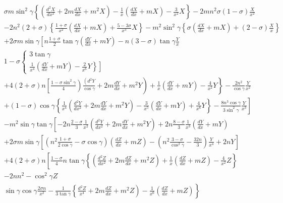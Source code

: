 \[\begin{aligned}
& \sigma m \sin ^2 \gamma\left\{\left(\frac{d^2 X}{d x^2}+2 m \frac{d X}{d x}+m^2 X\right)-\frac{1}{x}\left(\frac{d X}{d x}+m X\right)-\frac{3}{x^2} X\right\}-2 m n^2 \sigma(1-\sigma) \frac{X}{x^2} \\
& -2 n^2(2+\sigma)\left\{\frac{1+\sigma}{x^2}\left(\frac{d X}{d x}+m X\right)+\frac{5-3 \sigma}{x^3} X\right\}-m^2 \sin ^2 \gamma\left\{\sigma\left(\frac{d X}{d x}+m X\right)+(2-\sigma) \frac{X}{x}\right\} \\
& +2 \sigma m \sin \gamma\left[n \frac{1+\sigma}{2} \tan \gamma\left(\frac{d Y}{d x}+m Y\right)-n(3-\sigma) \tan \gamma \frac{Y}{x}\right. \\
& 1-\sigma\left\{\begin{array}{c}
3 \tan \gamma \\
\left.\left.\frac{1}{x^4}\left(\frac{d Y}{d x}+m Y\right)-\frac{2}{x^6} Y\right\}\right]
\end{array}\right. \\
& \left.\left.+4(2+\sigma) n\left[\frac{1-\sigma \sin ^2 \gamma}{4}\right) \frac{\left(d^2 Y\right.}{\cos \gamma}+2 m \frac{d Y}{d x}+m^2 Y\right)+\frac{1}{x}\left(\frac{d Y}{d x}+m Y\right)-\frac{4}{x^2} Y\right\}-\frac{2 n^2}{\cos \gamma} \frac{Y}{x^2} \\
& \left.+(1-\sigma) \cos \gamma\left\{\frac{1}{x^4}\left(\frac{d^2 Y}{d x^2}+2 m \frac{d Y}{d x}+m^2 Y\right)-\frac{3}{x^5}\left(\frac{d Y}{d x}+m Y\right)+\frac{4}{x^6} Y\right\}-\frac{8 n^3 \cos \gamma}{3 \sin ^2 \gamma} \frac{Y}{x^3}\right] \\
& -m^2 \sin \gamma \tan \gamma\left[-2 n \frac{2-\sigma}{3} \frac{1}{x^2}\left(\frac{d^2 Y}{d x^2}+2 m \frac{d Y}{d x}+m^2 Y\right)+2 n \frac{8-\sigma}{3} \frac{1}{x^3}\left(\frac{d Y}{d x}+m Y\right)\right. \\
& +2 \sigma m \sin \gamma\left[\left(n^2 \frac{1+\sigma}{2 \cos \gamma}-\sigma \cos \gamma\right)\left(\frac{d Z}{d x}+m Z\right)-\left(n^2 \frac{3-\sigma}{\cos ^2 \gamma}-\frac{32 n}{3}\right) \frac{Y}{x^4}+2 n Y\right] \\
& +4(2+\sigma) n\left[\frac{1-\sigma}{4} n \tan \gamma\left\{\left(\frac{d^2 Z}{d x^2}+2 m \frac{d Z}{d x}+m^2 Z\right)+\frac{1}{x}\left(\frac{d Z}{d x}+m Z\right)-\frac{4}{x^2} Z\right\}\right. \\
& -2 n n^2-\cos ^2 \gamma Z \\
& \left.\sin \gamma \cos \gamma \frac{2 \sigma n}{x^2}-\frac{1}{3 \tan \gamma}\left\{\frac{d^2 Z}{x^4}+2 m \frac{d Z}{d x}+m^2 Z\right)-\frac{1}{x^6}\left(\frac{d Z}{d x}+m Z\right)\right\} \\

\end{aligned}\]
